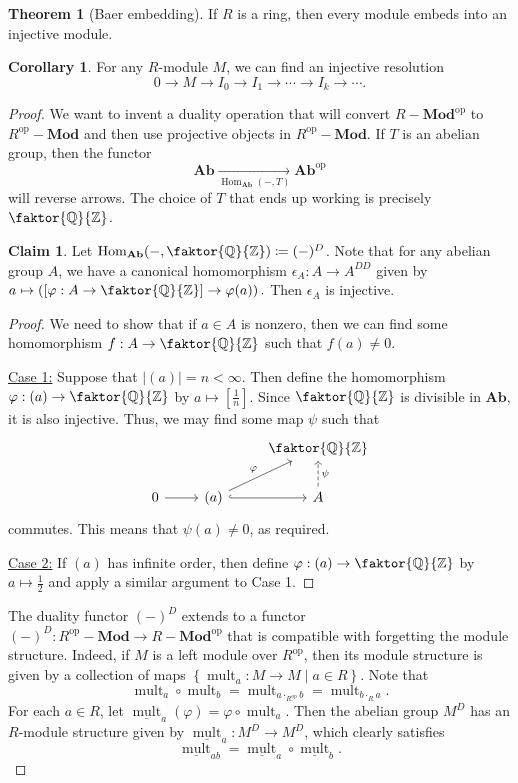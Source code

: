 \documentclass[10pt,letterpaper,cm]{nupset}
\theoremstyle{definition}
\theoremstyle{theorem}
\newtheorem{theorem}[definition]{Theorem}
\newtheorem{corollary}[definition]{Corollary}
\newtheorem*{claim}{Claim}
\theoremstyle{remark}
\newcommand{\Q}{\mathbb Q}
\newcommand{\Z}{\mathbb Z}
\newcommand{\1}{\mathbf{1}}
\newcommand{\0}{\vec 0}
\DeclareMathOperator{\op}{op}
\DeclareMathOperator{\Hom}{Hom}
\DeclareMathOperator{\mult}{mult}
\begin{document}
\begin{theorem}[Baer embedding]
If $R$ is a ring, then every module embeds into an injective module.
\begin{corollary}
For any $R$-module $M$, we can find an injective resolution $$ 0 \to M \to I_0 \to I_1 \to \cdots \to I_k \to \cdots  . $$
\end{corollary} 
\end{theorem}
\begin{proof}
We want to invent a duality operation that will convert $R {-} \mathbf{Mod}^{\op}$ to  $R^{\op} {-} \mathbf{Mod}$ and then use projective objects in $R^{\op}{-}\mathbf{Mod}$. If $T$ is an abelian group, then the functor $$ \mathbf{Ab}\underset{\Hom_{\mathbf{Ab}}(-, T)}{ \longrightarrow} \mathbf{Ab}^{\op}$$ will reverse arrows. The choice of $T$ that ends up working is precisely $\faktor{\Q}{\Z}$.
\begin{claim}
Let $\Hom_{\mathbf{Ab}}(-, \faktor{\Q}{\Z}) \coloneqq  (-)^D$. Note that for any abelian group $A$, we have a canonical homomorphism $\epsilon_A : A \to A^{DD}$ given by $a \mapsto \left(\left[\varphi :A \to \faktor{\Q}{\Z}\right] \to \varphi(a)\right).$ Then $\epsilon_A$ is injective.
\end{claim}
\begin{proof}
We need to show that if $a\in A$ is nonzero, then we can find some homomorphism $f: A \to \faktor{\Q}{\Z}$ such that $f(a) \ne 0$.

\underline{Case 1:} Suppose that $\left\lvert{(a)}\right\rvert = n< \infty$. Then define the homomorphism $\varphi : (a) \to \faktor{\Q}{\Z}$ by $a \mapsto [\frac{1}{n}]$. Since $\faktor{\Q}{\Z}$ is divisible in $\mathbf{Ab}$, it is also injective. Thus, we may find some map  $\psi$ such that 
\[
\begin{tikzcd}
 &  & \faktor{\Q}{\Z} \\
0 \arrow[r] & (a) \arrow[r, hook] \arrow[ru, "\varphi"] & A \arrow[u, "\psi"', dashed]
\end{tikzcd}
\] commutes. This means that $\psi(a) \ne 0$, as required.

\underline{Case 2:} If $\left(a\right)$ has infinite order, then define $\varphi : \left(a\right) \to \faktor{\Q}{\Z}$ by $a \mapsto \frac{1}{2}$ and apply a similar argument to Case 1.
\end{proof}


The duality functor $\left(-\right)^D$ extends to a functor $ \left(-\right)^D: R^{\op}{-}\mathbf{Mod} \to R {-}\mathbf{Mod}^{\op}$ that is compatible with forgetting the module structure. Indeed, if $M$ is a left module over $R^{\op}$, then its module structure is given by a collection of maps $\left\{\mult_a : M \to M \mid a\in R\right\}$. Note that $$ \mult_a \circ \mult_b = \mult_{a \cdot_{R^{\op}} b} =  \mult_{b \cdot_{R} a}   .$$ For each $a\in R$, let $\underline{\mult}_a(\varphi) = \varphi \circ {\mult}_a$. Then the abelian group $M^D$ has an $R$-module structure given by $ \underline{\mult}_a: M^D \to M^D$, which clearly satisfies $$\underline{\mult}_{ab} = \underline{\mult}_a \circ\underline{\mult}_b.$$



\end{proof}
\end{document}
